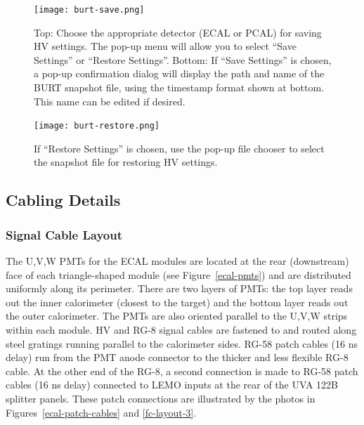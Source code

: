 \documentclass[letterpaper,10pt]{article}
\begin{document}
\begin{figure}[htbp]
  \centering
  \texttt{[image: burt-save.png]}
  \vspace{2mm}
  \caption{Top: Choose the appropriate detector (ECAL or PCAL) for saving HV settings.  The pop-up menu will
    allow you to select ``Save Settings'' or ``Restore Settings''.  Bottom: If ``Save Settings'' is chosen,
    a pop-up confirmation dialog will display the path and name of the BURT snapshot file, using the timestamp format shown at bottom.
    This name can be edited if desired.}
\label{backup-restore1}
\end{figure}
\begin{figure}[htbp]
  \centering
  \texttt{[image: burt-restore.png]}
  \vspace{2mm}
  \caption{If ``Restore Settings'' is chosen, use the pop-up file chooser to select the snapshot
    file for restoring HV settings.}
\label{backup-restore2}
\end{figure}
\subsection{Cabling Details}

\subsubsection{Signal Cable Layout}
\label{signal-conn}

The U,V,W PMTs for the ECAL modules are located at the rear (downstream) face of each triangle-shaped module
(see Figure~\ref{ecal-pmts}) and are distributed uniformly along its perimeter.  There are two layers of
PMTs: the top layer reads out the inner calorimeter (closest to the target) and the bottom layer reads out
the outer calorimeter. The PMTs are also oriented
parallel to the U,V,W strips within each module.  HV and RG-8 signal cables are fastened to and routed along steel gratings
running parallel to the calorimeter sides.  RG-58 patch cables (16 ns delay) run from the PMT anode connector
to the thicker and less flexible RG-8 cable.  At the other end of the RG-8, a second connection is made to
RG-58 patch cables (16 ns delay) connected to LEMO inputs at the rear of the UVA 122B splitter panels.  These
patch connections are illustrated by the photos in Figures~\ref{ecal-patch-cables} and \ref{fc-layout-3}.
\end{document}

